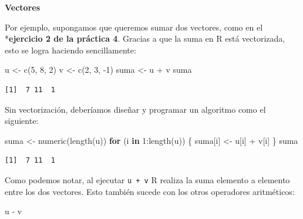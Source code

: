\documentclass[
]{book}
\newenvironment{Shaded}{\begin{snugshade}}{\end{snugshade}}
\newcommand{\ControlFlowTok}[1]{\textcolor[rgb]{0.13,0.29,0.53}{\textbf{#1}}}
\newcommand{\DecValTok}[1]{\textcolor[rgb]{0.00,0.00,0.81}{#1}}
\newcommand{\FunctionTok}[1]{\textcolor[rgb]{0.00,0.00,0.00}{#1}}
\newcommand{\NormalTok}[1]{#1}
\newcommand{\OtherTok}[1]{\textcolor[rgb]{0.56,0.35,0.01}{#1}}
\newcommand{\SpecialCharTok}[1]{\textcolor[rgb]{0.00,0.00,0.00}{#1}}
\begin{document}
\textbf{Vectores}

Por ejemplo, supongamos que queremos sumar dos vectores, como en el *\textbf{ejercicio 2 de la práctica 4}. Gracias a que la suma en R está vectorizada, esto se logra haciendo sencillamente:

\begin{Shaded}
\begin{Highlighting}[]
\NormalTok{u }\OtherTok{\textless{}{-}} \FunctionTok{c}\NormalTok{(}\DecValTok{5}\NormalTok{, }\DecValTok{8}\NormalTok{, }\DecValTok{2}\NormalTok{)}
\NormalTok{v }\OtherTok{\textless{}{-}} \FunctionTok{c}\NormalTok{(}\DecValTok{2}\NormalTok{, }\DecValTok{3}\NormalTok{, }\SpecialCharTok{{-}}\DecValTok{1}\NormalTok{)}
\NormalTok{suma }\OtherTok{\textless{}{-}}\NormalTok{ u }\SpecialCharTok{+}\NormalTok{ v}
\NormalTok{suma}
\end{Highlighting}
\end{Shaded}

\begin{verbatim}
[1]  7 11  1
\end{verbatim}

Sin vectorización, deberíamos diseñar y programar un algoritmo como el siguiente:

\begin{Shaded}
\begin{Highlighting}[]
\NormalTok{suma }\OtherTok{\textless{}{-}} \FunctionTok{numeric}\NormalTok{(}\FunctionTok{length}\NormalTok{(u))}
\ControlFlowTok{for}\NormalTok{ (i }\ControlFlowTok{in} \DecValTok{1}\SpecialCharTok{:}\FunctionTok{length}\NormalTok{(u)) \{ }
\NormalTok{    suma[i] }\OtherTok{\textless{}{-}}\NormalTok{ u[i] }\SpecialCharTok{+}\NormalTok{ v[i]}
\NormalTok{\}}
\NormalTok{suma}
\end{Highlighting}
\end{Shaded}

\begin{verbatim}
[1]  7 11  1
\end{verbatim}

Como podemos notar, al ejecutar \texttt{u\ +\ v} R realiza la suma elemento a elemento entre los dos vectores. Esto también sucede con los otros operadores aritméticos:

\begin{Shaded}
\begin{Highlighting}[]
\NormalTok{u }\SpecialCharTok{{-}}\NormalTok{ v}
\end{Highlighting}
\end{Shaded}
\end{document}
